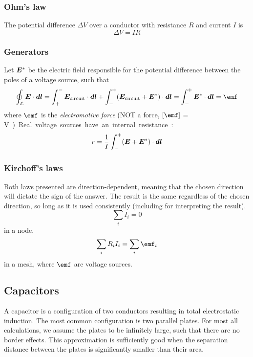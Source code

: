     \subsubsection{Ohm's law}
        The potential difference $\Delta V$ over a conductor with resistance $R$ and current $I$ is
        \begin{equation}
            \Delta V = IR
        \end{equation}
        
    \subsubsection{Generators}
        Let $\bm{E}^*$ be the electric field responsible for the potential difference between the poles of a voltage source, such that
        \begin{equation}
            \oint_\mathcal{L} \E\cdot \vec{dl} = \int_+^-\E_{\text{circuit}}\cdot \vec{dl} + \int_-^+(\E_{\text{circuit}} + \E^*)\cdot \vec{dl} = \int_-^+\E^*\cdot \vec{dl} = \emf
        \end{equation}
        where $\emf$ is the \textit{electromotive force} (NOT a force, $\left[\emf\right]$ = \si\volt)
        
        Real voltage sources have an internal resistance:
        \begin{equation}
            r = \frac{1}{I}\int_-^+(\bm{E} + \bm{E}^*)\cdot\bm{dl}
        \end{equation}
        
    \subsubsection{Kirchoff's laws}
        Both laws presented are direction-dependent, meaning that the chosen direction will dictate the sign of the answer. 
        The result is the same regardless of the chosen direction, so long as it is used consistently (including for interpreting the result).
        \begin{equation}
            \sum_i I_i = 0
        \end{equation}
        in a node.
        \begin{equation}
            \sum_i R_iI_i = \sum_i \emf_i
        \end{equation}
        in a mesh, where $\emf$ are voltage sources. 

    \subsection{Capacitors}
    A capacitor is a configuration of two conductors resulting in total electrostatic induction. 
    The most common configuration is  two parallel plates.
    For most all calculations, we assume the plates to be infinitely large, such that there are no border effects. 
    This approximation is sufficiently good when the separation distance between the plates is significantly smaller than their area.
    
